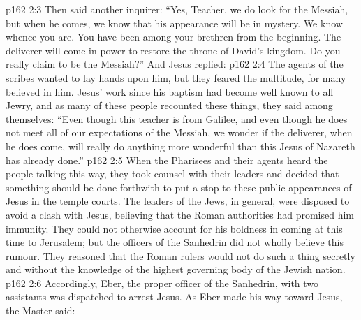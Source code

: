 \vs p162 2:3 Then said another inquirer: “Yes, Teacher, we do look for the Messiah, but when he comes, we know that his appearance will be in mystery. We know whence you are. You have been among your brethren from the beginning. The deliverer will come in power to restore the throne of David’s kingdom. Do you really claim to be the Messiah?” And Jesus replied: 
\vs p162 2:4 The agents of the scribes wanted to lay hands upon him, but they feared the multitude, for many believed in him. Jesus’ work since his baptism had become well known to all Jewry, and as many of these people recounted these things, they said among themselves: “Even though this teacher is from Galilee, and even though he does not meet all of our expectations of the Messiah, we wonder if the deliverer, when he does come, will really do anything more wonderful than this Jesus of Nazareth has already done.”
\vs p162 2:5 When the Pharisees and their agents heard the people talking this way, they took counsel with their leaders and decided that something should be done forthwith to put a stop to these public appearances of Jesus in the temple courts. The leaders of the Jews, in general, were disposed to avoid a clash with Jesus, believing that the Roman authorities had promised him immunity. They could not otherwise account for his boldness in coming at this time to Jerusalem; but the officers of the Sanhedrin did not wholly believe this rumour. They reasoned that the Roman rulers would not do such a thing secretly and without the knowledge of the highest governing body of the Jewish nation.
\vs p162 2:6 Accordingly, Eber, the proper officer of the Sanhedrin, with two assistants was dispatched to arrest Jesus. As Eber made his way toward Jesus, the Master said: 
